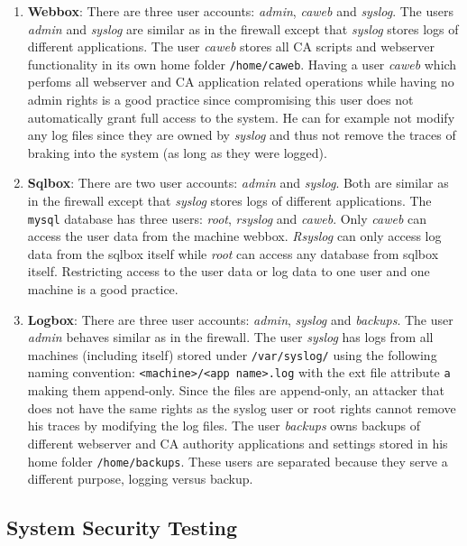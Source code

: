 \documentclass[english]{article}
\newcommand{\code}[1]{\texttt{#1}}
\begin{document}
\begin{enumerate}
\begin{enumerate}[label=(\alph*)]
\item \textbf{Webbox}: There are three user accounts: \textit{admin}, \textit{caweb} and \textit{syslog}. The users \textit{admin} and \textit{syslog} are similar as in the firewall except that \textit{syslog} stores logs of different applications. The user \textit{caweb} stores all CA scripts and webserver functionality in its own home folder \texttt{/home/caweb}. Having a user \textit{caweb} which perfoms all webserver and CA application related operations while having no admin rights is a good practice since compromising this user does not automatically grant full access to the system. He can for example not modify any log files since they are owned by \textit{syslog} and thus not remove the traces of braking into the system (as long as they were logged).

\item \textbf{Sqlbox}: There are two user accounts: \textit{admin} and \textit{syslog}. Both are similar as in the firewall except that \textit{syslog} stores logs of different applications. The \code{mysql} database has three users: \textit{root}, \textit{rsyslog} and \textit{caweb}. Only \textit{caweb} can access the user data from the machine webbox. \textit{Rsyslog} can only access log data from the sqlbox itself while \textit{root} can access any database from sqlbox itself. Restricting access to the user data or log data to one user and one machine is a good practice.

\item \textbf{Logbox}: There are three user accounts: \textit{admin}, \textit{syslog} and \textit{backups}. The user \textit{admin} behaves similar as in the firewall. The user \textit{syslog} has logs from all machines (including itself) stored under \texttt{/var/syslog/} using the following naming convention: \texttt{<machine>/<app name>.log} with the ext file attribute \texttt{a} making them append-only. Since the files are append-only, an attacker that does not have the same rights as the syslog user or root rights cannot remove his traces by modifying the log files. The user \textit{backups} owns backups of different webserver and CA authority applications and settings stored in his home folder \texttt{/home/backups}. These users are separated because they serve a different purpose, logging versus backup.
\end{enumerate}
\end{enumerate}

\subsection{System Security Testing} %
\end{document}

